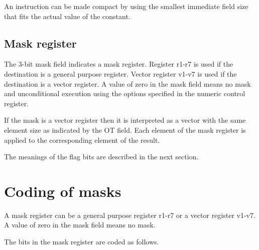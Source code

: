 \documentclass[forwardcom.tex]{subfiles}
\begin{document}
An instruction can be made compact by using the smallest immediate field size that fits the actual value of the constant.

\subsection{Mask register}
The 3-bit mask field indicates a mask register. Register r1-r7 is used if the destination is a general purpose register. Vector register v1-v7 is used if the destination is a vector register. A value of zero in the mask field means no mask and unconditional execution using the options specified in the numeric control register.
\vspace{2mm}

If the mask is a vector register then it is interpreted as a vector with the same element size as indicated by the OT field. Each element of the mask register is applied to the corresponding element of the result.
\vspace{2mm}

The meanings of the flag bits are described in the next section.

\section{Coding of masks}
A mask register can be a general purpose register r1-r7 or a vector register v1-v7. A value of zero in the mask field means no mask.
\vspace{2mm}

The bits in the mask register are coded as follows.
\end{document}
